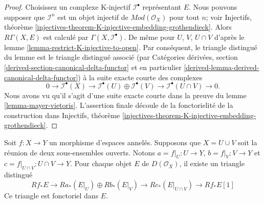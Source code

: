 \begin{proof}

Choisissez un complexe K-injectif $\mathcal{I}^\bullet$
représentant $E$. Nous pouvons supposer que $\mathcal{I}^n$ est un objet injectif de $\textit{Mod}(\mathcal{O}_X)$ pour tout $n$; voir Injectifs, théorème
\ref{injectives-theorem-K-injective-embedding-grothendieck}. Alors $R\Gamma(X, E)$ est calculé par $\Gamma(X, \mathcal{I}^\bullet)$. De même pour $U$, $V$, $U \cap V$ d'après le lemme \ref{lemma-restrict-K-injective-to-open}. Par conséquent, le triangle distingué du lemme est le triangle distingué associé (par Catégories dérivées, section
\ref{derived-section-canonical-delta-functor} et en particulier \ref{derived-lemma-derived-canonical-delta-functor}) à la suite exacte courte des complexes
$$
0 \to
\mathcal{I}^\bullet(X) \to
\mathcal{I}^\bullet(U) \oplus \mathcal{I}^\bullet(V) \to
\mathcal{I}^\bullet(U \cap V) \to
0.
$$
Nous avons vu qu'il s'agit d'une suite exacte courte dans la preuve du lemme \ref{lemma-mayer-vietoris}. L'assertion finale découle de la fonctorielité de la construction dans Injectifs, théorème
\ref{injectives-theorem-K-injective-embedding-grothendieck}.

\end{proof}

\begin{lemma}

\label{lemma-unbounded-relative-mayer-vietoris}
Soit $f : X \to Y$ un morphisme d'espaces annelés. Supposons que $X = U \cup V$ soit la réunion de deux sous-ensembles ouverts. Notons $a = f|_U : U \to Y$, $b = f|_V : V \to Y$ et $c = f|_{U \cap V} : U \cap V \to Y$. Pour chaque objet $E$ de $D(\mathcal{O}_X)$, il existe un triangle distingué $$
Rf_*E \to
Ra_*(E|_U) \oplus Rb_*(E|_V) \to
Rc_*(E|_{U \cap V}) \to
Rf_*E[1]
$$ Ce triangle est fonctoriel dans $E$.
\end{lemma}

